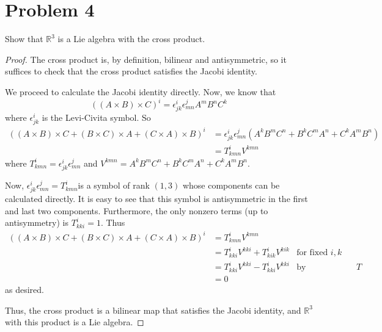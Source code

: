 \documentclass[fontsize=11pt]{scrartcl} %
\numberwithin{equation}{section} %
\numberwithin{figure}{section} %
\numberwithin{table}{section} %
\newcommand{\R}{\mathbb{R}}
\begin{document}
\section*{Problem 4} %
Show that $\R^3$ is a Lie algebra with the cross product.
\\
\begin{proof}
    The cross product is, by definition, bilinear and antisymmetric, so it suffices to check that the
    cross product satisfies the Jacobi identity.

    We proceed to calculate the Jacobi identity directly. Now, we know that
    \[
        ((A\times B)\times C)^i = \epsilon^i_{jk}\epsilon^j_{mn}A^mB^nC^k
    \]
    where $\epsilon^i_{jk}$ is the Levi-Civita symbol.
    So
    \[
        \begin{aligned}
            ((A\times B)\times C + (B\times C)\times A + (C\times A)\times B)^i &=
            \epsilon^i_{jk}\epsilon^j_{mn}(A^kB^mC^n + B^kC^mA^n + C^kA^mB^n)\\
            &=T^i_{kmn}V^{kmn}
        \end{aligned}
    \]
    where $T^i_{kmn}= \epsilon^i_{jk}\epsilon^j_{mn}$ and $V^{kmn} = A^kB^mC^n +
    B^kC^mA^n + C^kA^mB^n$.

    Now, $\epsilon^i_{jk}\epsilon^j_{mn} = T^i_{kmn}$is a symbol of rank $(1,3)$ whose
    components can be calculated directly. It is easy to see that this symbol is
    antisymmetric in the first and last two components. Furthermore, the only
    nonzero terms (up to antisymmetry) is $T^i_{kki} = 1$. Thus
    \[
        \begin{aligned}
            ((A\times B)\times C + (B\times C)\times A + (C\times A)\times B)^i &=
            T^i_{kmn}V^{kmn}\\
            &=T^i_{kki}V^{kki} + T^i_{kik}V^{kik} &\textrm{for fixed }i,k\\
            &=T^i_{kki}V^{kki} - T^i_{kki}V^{kki} &\textrm{by antisymmetry of
            }T\\
            &=0
        \end{aligned}
    \]
    as desired.

    Thus, the cross product is a bilinear map that satisfies the Jacobi
    identity, and $\R^3$ with this product is a Lie algebra.
\end{proof}
\end{document}
